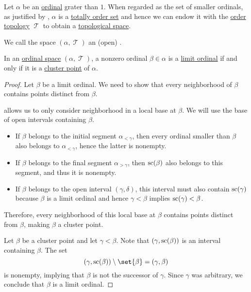 \begin{definition}\label{def:ordinal_space}
  Let \( \alpha \) be an \hyperref[def:ordinal]{ordinal} grater than \( 1 \). When regarded as the set of smaller ordinals, as justified by , \( \alpha \) is a \hyperref[def:totally_ordered_set]{totally order set} and hence we can endow it with the \hyperref[def:order_topology]{order topology} \( \mscrT \) to obtain a \hyperref[def:topological_space]{topological space}.

  We call the space \( (\alpha, \mscrT) \) an (open) .
\end{definition}

\begin{proposition}\label{thm:limit_ordinal_order_topology}
  In an \hyperref[def:ordinal_space]{ordinal space} \( (\alpha, \mscrT) \), a nonzero ordinal \( \beta \in \alpha \) is a \hyperref[def:successor_and_limit_ordinal]{limit ordinal} if and only if it is a \hyperref[def:set_cluster_point]{cluster point} of \( \alpha \).
\end{proposition}
\begin{proof}
  \SufficiencySubProof Let \( \beta \) be a limit ordinal. We need to show that every neighborhood of \( \beta \) contains points distinct from \( \beta \).

   allows us to only consider neighborhood in a local base at \( \beta \). We will use the base of open intervals containing \( \beta \).
  \begin{itemize}
    \item If \( \beta \) belongs to the initial segment \( \alpha_{<\gamma} \), then every ordinal smaller than \( \beta \) also belongs to \( \alpha_{<\gamma} \), hence the latter is nonempty.

    \item If \( \beta \) belongs to the final segment \( \alpha_{>\gamma} \), then \( \op{sc}(\beta) \) also belongs to this segment, and thus it is nonempty.

    \item If \( \beta \) belongs to the open interval \( (\gamma, \delta) \), this interval must also contain \( \op{sc}(\gamma) \) because \( \beta \) is a limit ordinal and hence \( \gamma < \beta \) implies \( \op{sc}(\gamma) < \beta \).
  \end{itemize}

  Therefore, every neighborhood of this local base at \( \beta \) contains points distinct from \( \beta \), making \( \beta \) a cluster point.

  \NecessitySubProof Let \( \beta \) be a cluster point and let \( \gamma < \beta \). Note that \( (\gamma, \op{sc}(\beta)) \) is an interval containing \( \beta \). The set
  \begin{equation*}
    (\gamma, \op{sc}(\beta)) \setminus \set{ \beta }
    =
    (\gamma, \beta)
  \end{equation*}
  is nonempty, implying that \( \beta \) is not the successor of \( \gamma \). Since \( \gamma \) was arbitrary, we conclude that \( \beta \) is a limit ordinal.
\end{proof}
